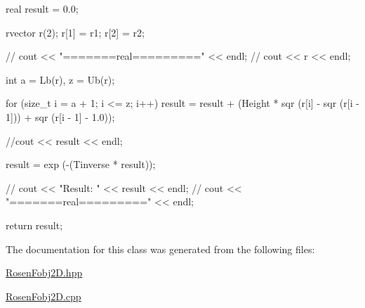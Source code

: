 \begin{DoxyCode}
{   
  real result = 0.0;
   
   rvector r(2);
   r[1] = r1;
   r[2] = r2;
   
  // cout << "=======real=========" << endl;
  // cout << r << endl;
   
    int a = Lb(r), z = Ub(r);
   
    for (size_t i = a + 1; i <= z; i++)
    {
      result = result + (Height * sqr (r[i] - sqr (r[i - 1])) +
        sqr (r[i - 1] - 1.0));
    }
   
   //cout << result << endl;
   
  result = exp (-(Tinverse * result));

//  cout << "Result: " << result << endl; 
//  cout << "=======real=========" << endl;

   return result;
}
\end{DoxyCode}


\-The documentation for this class was generated from the following files\-:\begin{DoxyCompactItemize}
\item 
\hyperlink{RosenFobj2D_8hpp}{\-Rosen\-Fobj2\-D.\-hpp}\item 
\hyperlink{RosenFobj2D_8cpp}{\-Rosen\-Fobj2\-D.\-cpp}\end{DoxyCompactItemize}
